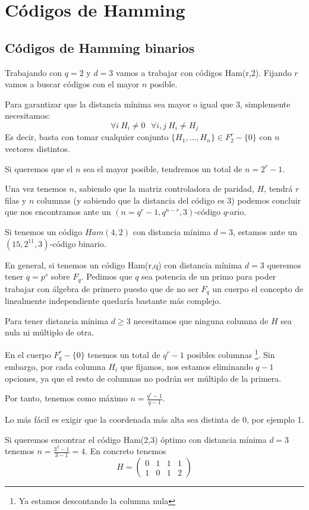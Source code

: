 \chapter{Códigos de Hamming}

\section{Códigos de Hamming binarios}
Trabajando con $q=2$ y $d=3$ vamos a trabajar con códigos Ham(r,2). Fijando $r$ vamos a buscar códigos con el mayor $n$ posible.

Para garantizar que la distancia mínima sea mayor o igual que 3, simplemente necesitamos:
\[\forall i \ H_i \neq 0 \ \ \ \forall i,j \ H_i \neq H_j\]
Es decir, basta con tomar cualquier conjunto $\{H_1,...,H_n\}\in F_2^r-\{0\}$ con $n$ vectores distintos.

Si queremos que el $n$ sea el mayor posible, tendremos un total de $n=2^r-1$.

Una vez tenemos $n$, sabiendo que la matriz controladora de paridad, $H$, tendrá $r$ filas y $n$ columnas (y sabiendo que la distancia del código es 3) podemos concluir que nos encontramos ante un $(n=q^r-1,q^{n-r},3)$-código $q$-ario.

\begin{example}
Si tenemos un código $Ham(4,2)$ con distancia mínima $d=3$, estamos ante un $(15,2^{11},3)$-código binario.

\end{example}

En general, si tenemos un código Ham(r,q) con distancia mínima $d=3$ queremos tener $q=p^s$ sobre $F_q$. Pedimos que $q$ sea potencia de un primo para poder trabajar con álgebra de primero puesto que de no ser $F_q$ un cuerpo el concepto de linealmente independiente quedaría bastante más complejo.

Para tener distancia mínima $d \geq 3$ necesitamos que ninguna columna de $H$ sea nula ni múltiplo de otra.

En el cuerpo $F_q^r-\{0\}$ tenemos un total de $q^r-1$ posibles columnas \footnote{Ya estamos descontando la columna nula}. Sin embargo, por cada columna $H_i$ que fijamos, nos estamos eliminando $q-1$ opciones, ya que el resto de columnas no podrán ser múltiplo de la primera.

Por tanto, tenemos como máximo $n=\frac{q^r-1}{q-1}$.

Lo más fácil es exigir que la coordenada más alta sea distinta de 0, por ejemplo 1.

\begin{example}
Si queremos encontrar el código Ham(2,3) óptimo con distancia mínima $d=3$ tenemos $n=\frac{3^2-1}{3-1}=4$. En concreto tenemos
\[H=\left( \begin{array}{cccc}
0 & 1 & 1 & 1 \\
1 & 0 & 1 & 2
\end{array}\right)\]
\end{example}
